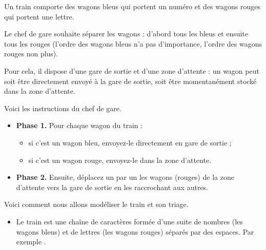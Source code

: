 \documentclass[11pt,class=report,crop=false]{standalone}
\begin{document}
\begin{activite}




Un train comporte des wagons bleus qui portent un numéro et des wagons rouges qui portent une lettre. 


Le chef de gare souhaite séparer les wagons : d'abord tous les bleus et ensuite tous les rouges (l'ordre des wagons bleus n'a pas d'importance, l'ordre des wagons rouges non plus). 


Pour cela, il dispose d'une gare de sortie et d'une zone d'attente : un wagon peut soit être directement envoyé à la gare de sortie, soit être momentanément stocké dans la zone d'attente.



Voici les instructions du chef de gare.
\begin{itemize}

  \item \textbf{Phase 1.} Pour chaque wagon du train :
     \begin{itemize} 
       \item si c'est un wagon bleu, envoyez-le directement en gare de sortie ;
       \item si c'est un wagon rouge, envoyez-le dans la zone d'attente.
     \end{itemize}
   
  \item \textbf{Phase 2.} Ensuite, déplacez un par un les wagons (rouges) de la zone d'attente vers la gare de sortie en les raccrochant aux autres.
\end{itemize}  
 
 
  


Voici comment nous allons modéliser le train et son triage.
\begin{itemize}
  \item Le train est une chaîne de caractères formée d'une suite de nombres (les wagons bleus) et de lettres (les wagons rouges) séparés par des espaces. Par exemple . 
  

\end{itemize}
\end{activite}
\end{document}
